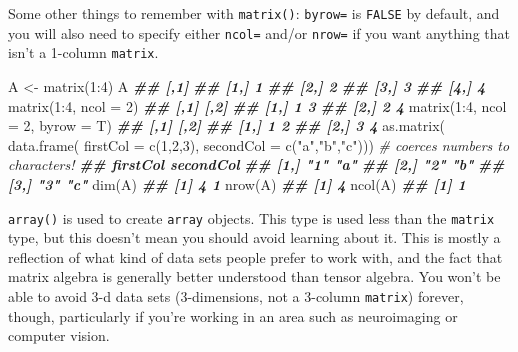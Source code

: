 \documentclass[
  12pt,
  krantz2]{krantz}
\makeatletter
\newenvironment{Shaded}{\begin{snugshade}}{\end{snugshade}}
\newcommand{\AttributeTok}[1]{\textcolor[rgb]{0.61,0.61,0.61}{#1}}
\newcommand{\CommentTok}[1]{\textcolor[rgb]{0.37,0.37,0.37}{\textit{#1}}}
\newcommand{\DecValTok}[1]{\textcolor[rgb]{0.06,0.06,0.06}{#1}}
\newcommand{\DocumentationTok}[1]{\textcolor[rgb]{0.37,0.37,0.37}{\textbf{\textit{#1}}}}
\newcommand{\FunctionTok}[1]{\textcolor[rgb]{0,0,0}{#1}}
\newcommand{\NormalTok}[1]{#1}
\newcommand{\OtherTok}[1]{\textcolor[rgb]{0.37,0.37,0.37}{#1}}
\newcommand{\SpecialCharTok}[1]{\textcolor[rgb]{0,0,0}{#1}}
\newcommand{\StringTok}[1]{\textcolor[rgb]{0.5,0.5,0.5}{#1}}
\newenvironment{kframe}{%
\medskip{}
\setlength{\fboxsep}{.8em}
 \def\at@end@of@kframe{}%
 \ifinner\ifhmode%
  \def\at@end@of@kframe{\end{minipage}}%
  \begin{minipage}{\columnwidth}%
 \fi\fi%
 \def\FrameCommand##1{\hskip\@totalleftmargin \hskip-\fboxsep
 \colorbox{shadecolor}{##1}\hskip-\fboxsep
     \hskip-\linewidth \hskip-\@totalleftmargin \hskip\columnwidth}%
 \MakeFramed {\advance\hsize-\width
   \@totalleftmargin\z@ \linewidth\hsize
   \@setminipage}}%
 {\par\unskip\endMakeFramed%
 \at@end@of@kframe}
\renewenvironment{Shaded}{\begin{kframe}}{\end{kframe}}
\makeatother
\begin{document}
Some other things to remember with \texttt{matrix()}: \texttt{byrow=} is \texttt{FALSE} by default, and you will also need to specify either \texttt{ncol=} and/or \texttt{nrow=} if you want anything that isn't a 1-column \texttt{matrix}.

\begin{Shaded}
\begin{Highlighting}[]
\NormalTok{A }\OtherTok{\textless{}{-}} \FunctionTok{matrix}\NormalTok{(}\DecValTok{1}\SpecialCharTok{:}\DecValTok{4}\NormalTok{)}
\NormalTok{A}
\DocumentationTok{\#\#      [,1]}
\DocumentationTok{\#\# [1,]    1}
\DocumentationTok{\#\# [2,]    2}
\DocumentationTok{\#\# [3,]    3}
\DocumentationTok{\#\# [4,]    4}
\FunctionTok{matrix}\NormalTok{(}\DecValTok{1}\SpecialCharTok{:}\DecValTok{4}\NormalTok{, }\AttributeTok{ncol =} \DecValTok{2}\NormalTok{)}
\DocumentationTok{\#\#      [,1] [,2]}
\DocumentationTok{\#\# [1,]    1    3}
\DocumentationTok{\#\# [2,]    2    4}
\FunctionTok{matrix}\NormalTok{(}\DecValTok{1}\SpecialCharTok{:}\DecValTok{4}\NormalTok{, }\AttributeTok{ncol =} \DecValTok{2}\NormalTok{, }\AttributeTok{byrow =}\NormalTok{ T)}
\DocumentationTok{\#\#      [,1] [,2]}
\DocumentationTok{\#\# [1,]    1    2}
\DocumentationTok{\#\# [2,]    3    4}
\FunctionTok{as.matrix}\NormalTok{(}
  \FunctionTok{data.frame}\NormalTok{(}
    \AttributeTok{firstCol =} \FunctionTok{c}\NormalTok{(}\DecValTok{1}\NormalTok{,}\DecValTok{2}\NormalTok{,}\DecValTok{3}\NormalTok{),}
    \AttributeTok{secondCol =} \FunctionTok{c}\NormalTok{(}\StringTok{"a"}\NormalTok{,}\StringTok{"b"}\NormalTok{,}\StringTok{"c"}\NormalTok{))) }\CommentTok{\# coerces numbers to characters!}
\DocumentationTok{\#\#      firstCol secondCol}
\DocumentationTok{\#\# [1,] "1"      "a"      }
\DocumentationTok{\#\# [2,] "2"      "b"      }
\DocumentationTok{\#\# [3,] "3"      "c"}
\FunctionTok{dim}\NormalTok{(A)}
\DocumentationTok{\#\# [1] 4 1}
\FunctionTok{nrow}\NormalTok{(A)}
\DocumentationTok{\#\# [1] 4}
\FunctionTok{ncol}\NormalTok{(A)}
\DocumentationTok{\#\# [1] 1}
\end{Highlighting}
\end{Shaded}

\texttt{array()} is used to create \texttt{array} objects. This type is used less than the \texttt{matrix} type, but this doesn't mean you should avoid learning about it. This is mostly a reflection of what kind of data sets people prefer to work with, and the fact that matrix algebra is generally better understood than tensor algebra. You won't be able to avoid 3-d data sets (3-dimensions, not a 3-column \texttt{matrix}) forever, though, particularly if you're working in an area such as neuroimaging or computer vision.
\end{document}
